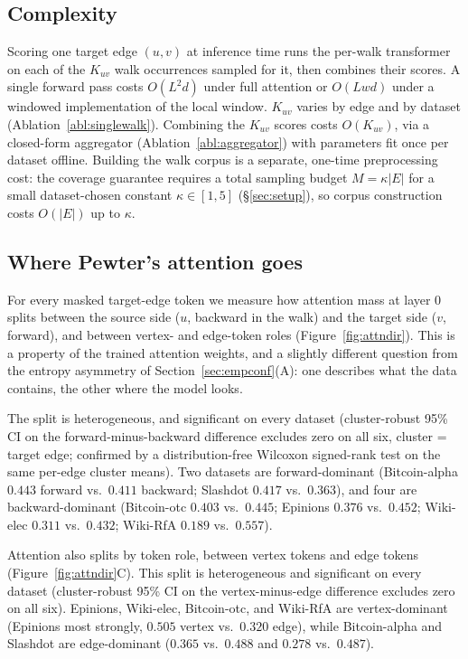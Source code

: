 \documentclass[sigconf, review, anonymous]{acmart}
\theoremstyle{plain}
\theoremstyle{definition}
\begin{document}
\subsection{Complexity}
\label{sec:complexity}
Scoring one target edge $(u,v)$ at inference time runs the per-walk transformer on each of the $K_{uv}$ walk occurrences sampled for it, then combines their scores. A single forward pass costs $O(L^2d)$ under full attention or $O(Lwd)$ under a windowed implementation of the local window. $K_{uv}$ varies by edge and by dataset (Ablation~\ref{abl:singlewalk}). Combining the $K_{uv}$ scores costs $O(K_{uv})$, via a closed-form aggregator (Ablation~\ref{abl:aggregator}) with parameters fit once per dataset offline. Building the walk corpus is a separate, one-time preprocessing cost: the coverage guarantee requires a total sampling budget $M=\kappa|E|$ for a small dataset-chosen constant $\kappa\in[1,5]$ (\S\ref{sec:setup}), so corpus construction costs $O(|E|)$ up to $\kappa$.

\subsection{Where Pewter's attention goes}

For every masked target-edge token we measure how attention mass at layer 0 splits between the source side ($u$, backward in the walk) and the target side ($v$, forward), and between vertex- and edge-token roles (Figure~\ref{fig:attndir}). This is a property of the trained attention weights, and a slightly different question from the entropy asymmetry of Section~\ref{sec:empconf}(A): one describes what the data contains, the other where the model looks. 

The split is heterogeneous, and significant on every dataset (cluster-robust 95\% CI on the forward-minus-backward difference excludes zero on all six, cluster = target edge; confirmed by a distribution-free Wilcoxon signed-rank test on the same per-edge cluster means). Two datasets are forward-dominant (Bitcoin-alpha $0.443$ forward vs.\ $0.411$ backward; Slashdot $0.417$ vs.\ $0.363$), and four are backward-dominant (Bitcoin-otc $0.403$ vs.\ $0.445$; Epinions $0.376$ vs.\ $0.452$; Wiki-elec $0.311$ vs.\ $0.432$; Wiki-RfA $0.189$ vs.\ $0.557$). 

Attention also splits by token role, between vertex tokens and edge tokens (Figure~\ref{fig:attndir}C). This split is heterogeneous and significant on every dataset (cluster-robust 95\% CI on the vertex-minus-edge difference excludes zero on all six). Epinions, Wiki-elec, Bitcoin-otc, and Wiki-RfA are vertex-dominant (Epinions most strongly, $0.505$ vertex vs.\ $0.320$ edge), while Bitcoin-alpha and Slashdot are edge-dominant ($0.365$ vs.\ $0.488$ and $0.278$ vs.\ $0.487$).
\end{document}
